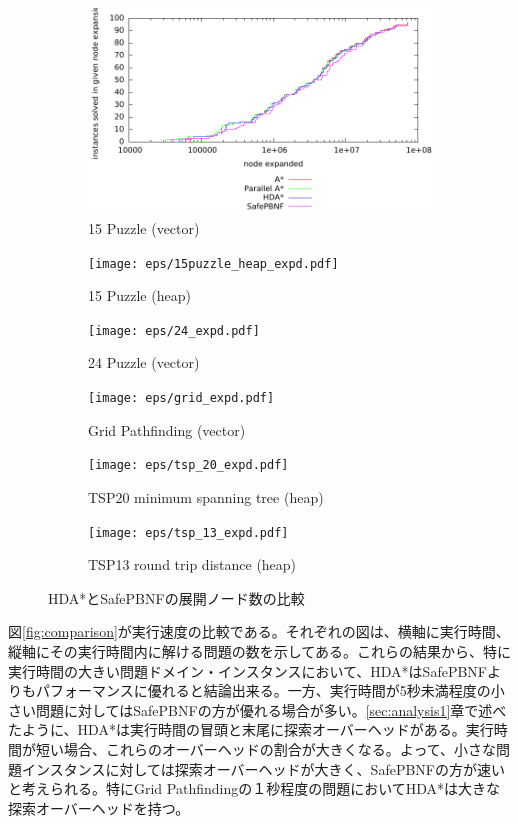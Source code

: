 \documentclass[uplatex]{jsarticle}
\begin{document}
\begin{figure}
	\centering
	\begin{subfigure}{0.4\columnwidth}
		\includegraphics[width=\columnwidth,draft]{eps/15puzzle_vector_expd.pdf}
		\caption{15 Puzzle (vector)}
		\label{fig:15puzzle_vector_expd}
	\end{subfigure}
	\begin{subfigure}{0.4\columnwidth}
		\texttt{[image: eps/15puzzle\_heap\_expd.pdf]}
		\caption{15 Puzzle (heap)}
		\label{fig:15puzzle_heap_expd}
	\end{subfigure}
	\begin{subfigure}{0.4\columnwidth}
		\texttt{[image: eps/24\_expd.pdf]}
		\caption{24 Puzzle (vector)}
		\label{fig:24puzzle_vector_expd}
	\end{subfigure}
	\begin{subfigure}{0.4\columnwidth}
		\texttt{[image: eps/grid\_expd.pdf]}
		\caption{Grid Pathfinding (vector)}
		\label{fig:grid_expd}
	\end{subfigure}
	\begin{subfigure}{0.4\columnwidth}
		\texttt{[image: eps/tsp\_20\_expd.pdf]}
		\caption{TSP20 minimum spanning tree (heap)}
		\label{fig:tsp_20_mst_expd}
	\end{subfigure}
	\begin{subfigure}{0.4\columnwidth}
		\texttt{[image: eps/tsp\_13\_expd.pdf]}
		\caption{TSP13 round trip distance (heap)}
		\label{fig:tsp_13_expd}
	\end{subfigure}
	\caption{HDA*とSafePBNFの展開ノード数の比較}
	\label{fig:comparison_expd}
\end{figure}%


図\ref{fig:comparison}が実行速度の比較である。それぞれの図は、横軸に実行時間、縦軸にその実行時間内に解ける問題の数を示してある。これらの結果から、特に実行時間の大きい問題ドメイン・インスタンスにおいて、HDA*はSafePBNFよりもパフォーマンスに優れると結論出来る。一方、実行時間が5秒未満程度の小さい問題に対してはSafePBNFの方が優れる場合が多い。\ref{sec:analysis1}章で述べたように、HDA*は実行時間の冒頭と末尾に探索オーバーヘッドがある。実行時間が短い場合、これらのオーバーヘッドの割合が大きくなる。よって、小さな問題インスタンスに対しては探索オーバーヘッドが大きく、SafePBNFの方が速いと考えられる。特にGrid Pathfindingの１秒程度の問題においてHDA*は大きな探索オーバーヘッドを持つ。
\newline
\end{document}
